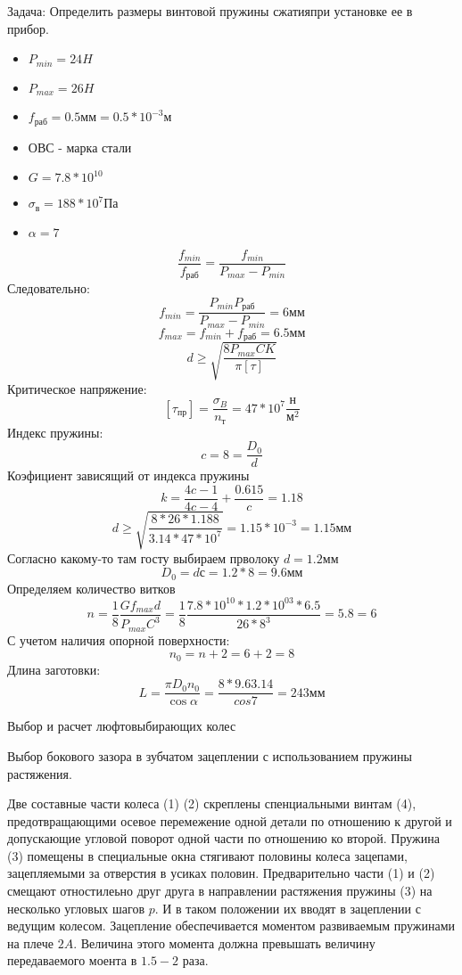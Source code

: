 \documentclass{article}
\begin{document}
Задача: Определить размеры винтовой пружины сжатияпри установке ее в прибор.
\begin{itemize}
	\item $P_{min} = 24 H$
	\item $P_{max} = 26 H$
	\item $f_{раб} = 0.5 мм = 0.5 * 10^{-3} м$
	\item $ОВС$ - марка стали
	\item $G = 7.8 * 10^{10}$
	\item $ \sigma_{в} = 188 * 10^7 Па$
	\item $ \alpha = 7$
\end{itemize}

$$
\frac{f_{min}}{f_{раб}} = \frac{f_{min}}{P_{max} - P_{min}}
$$
Следовательно:
$$
f_{min} =  \frac{P_{min} P_{раб}}{P_{max} - P_{min}} = 6 мм
$$
$$
f_{max} = f_{min} + f_{раб} = 6.5 мм
$$
$$
d \ge \sqrt { \frac{8 P_{max} C K}{\pi [\tau]} }
$$
Критическое напряжение:
$$
[\tau_{пр}] = \frac{\sigma_B}{n_т} = 47 * 10^7 \frac{н}{м^2} 
$$
Индекс пружины:
$$
c = 8 = \frac{D_0}{d} 
$$
Коэфициент зависящий от индекса пружины
$$
k = \frac{4c - 1}{4c - 4}  + \frac{0.615}{c} = 1.18
$$
$$
d \ge \sqrt { \frac{8 * 26 * 1.18 8}{3.14 * 47 * 10^7}} = 1.15 * 10^{-3} = 1.15 мм
$$
Согласно какому-то там госту выбираем прволоку $d = 1.2 мм$
$$
D_0 = d с = 1.2 * 8 = 9.6 мм
$$
Определяем количество витков
$$
n = \frac{1}{8} \frac{G f_{max} d }{P_{max} C^3} = \frac{1}{8} \frac{7.8 * 10^{10} * 1.2 * 10^{03} * 6.5}{26 * 8^3} = 5.8 = 6
$$
С учетом наличия опорной поверхности:
$$
n_0 = n + 2 = 6 + 2 = 8
$$
Длина заготовки:
$$
L = \frac{\pi D_0 n_0}{\cos{ \alpha}} = \frac{8 * 9.6 3.14}{cos{7}} = 243 мм
$$

Выбор и расчет люфтовыбирающих колес

Выбор бокового зазора в зубчатом зацеплении с использованием пружины растяжения.

Две составные части колеса (1) (2) скреплены спенциальными винтам (4), предотвращающими осевое перемежение одной детали по отношению к другой и допускающие угловой поворот одной части по отношению ко второй. Пружина (3) помещены в специальные окна   стягивают половины колеса зацепами, зацепляемыми за отверстия в усиках половин. Предварительно части (1) и (2) смещают отностилеьно друг друга в направлении растяжения пружины (3) на несколько угловых шагов $p$. И в таком положении их вводят в зацеплении с ведущим колесом. Зацепление обеспечивается моментом развиваемым пружинами на плече $2A$. Величина этого момента должна превышать величину передаваемого моента в $1.5-2$ раза. 
\end{document}
